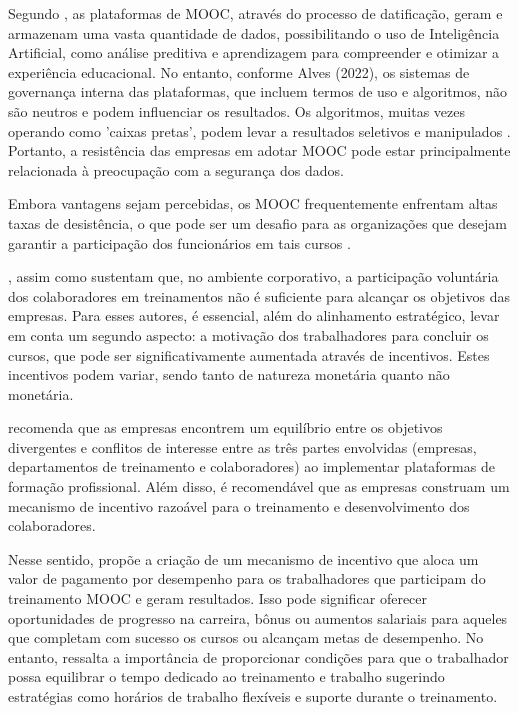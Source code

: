 \documentclass[portuguese]{textolivre}
\begin{document}
Segundo \textcite{dijck_data_2017}, as plataformas de MOOC, através do processo de datificação, geram e armazenam uma vasta quantidade de dados, possibilitando o uso de Inteligência Artificial, como análise preditiva e aprendizagem para compreender e otimizar a experiência educacional. No entanto, conforme Alves (2022), os sistemas de governança interna das plataformas, que incluem termos de uso e algoritmos, não são neutros e podem influenciar os resultados. Os algoritmos, muitas vezes operando como 'caixas pretas', podem levar a resultados seletivos e manipulados \cite{knox_beyond_2018}. Portanto, a resistência das empresas em adotar MOOC pode estar principalmente relacionada à preocupação com a segurança dos dados. 

Embora vantagens sejam percebidas, os MOOC frequentemente enfrentam altas taxas de desistência, o que pode ser um desafio para as organizações que desejam garantir a participação dos funcionários em tais cursos \textcite{sureephong_effect_2020,becerra_diseno_2020,yan_construction_2022}. 

\textcite{yan_construction_2022}, assim como \textcite{sureephong_effect_2020} sustentam que, no ambiente corporativo, a participação voluntária dos colaboradores em treinamentos não é suficiente para alcançar os objetivos das empresas. Para esses autores, é essencial, além do alinhamento estratégico, levar em conta um segundo aspecto: a motivação dos trabalhadores para concluir os cursos, que pode ser significativamente aumentada através de incentivos. Estes incentivos podem variar, sendo tanto de natureza monetária quanto não monetária.

\textcite{yan_construction_2022} recomenda que as empresas encontrem um equilíbrio entre os objetivos divergentes e conflitos de interesse entre as três partes envolvidas (empresas, departamentos de treinamento e colaboradores) ao implementar plataformas de formação profissional. Além disso, é recomendável que as empresas construam um mecanismo de incentivo razoável para o treinamento e desenvolvimento dos colaboradores. 

Nesse sentido, \textcite{yan_construction_2022} propõe a criação de um mecanismo de incentivo que aloca um valor de pagamento por desempenho para os trabalhadores que participam do treinamento MOOC e geram resultados. Isso pode significar oferecer oportunidades de progresso na carreira, bônus ou aumentos salariais para aqueles que completam com sucesso os cursos ou alcançam metas de desempenho. No entanto, \textcite{yan_construction_2022} ressalta a importância de proporcionar condições para que o trabalhador possa equilibrar o tempo dedicado ao treinamento e trabalho sugerindo estratégias como horários de trabalho flexíveis e suporte durante o treinamento. 
\end{document}
